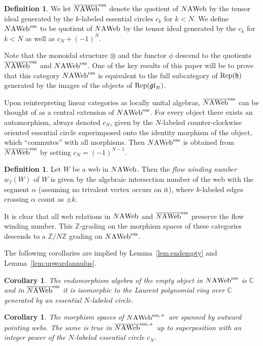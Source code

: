 \documentclass[11pt]{article}
\newtheorem{coro}[theo]{Corollary}
\theoremstyle{definition}
\newtheorem{defi}[theo]{Definition}
\numberwithin{equation}{section}
\newcommand{\glnn}[1]{\mf{gl}_{#1}}
\def\mf{\mathfrak}
\def\C{{\mathbb C}}
\def\Z{{\mathbb Z}}
\newcommand{\reph}{\Rep(\h)}
\def\h{{\mathfrak h}}
\newcommand{\Rep}{\cat{Rep}}
\newcommand{\cat}[1]{\ensuremath{\mbox{\bfseries {\upshape {#1}}}}}
\newcommand{\AWeb}[1][]{#1\cat{A}\cat{Web}}
\newcommand{\essAWeb}[1][]{#1\AWeb^{\mathrm{ess}}}
\newcommand{\essAWebp}[1][]{#1\AWeb^{\mathrm{ess},+}}
\newcommand{\essbAWeb}[1][]{\overline{#1\AWeb}^{\mathrm{ess}}}
\newcommand{\essbAWebp}[1][]{\overline{#1\AWeb}^{\mathrm{ess},+}}
\begin{document}
\begin{defi} We let $\essbAWeb[N]$ denote the quotient of $\AWeb[N]$ by
the tensor ideal generated by the $k$-labeled essential circles $c_k$ for $k<N$. We
define $\essAWeb[N]$ to be quotient of $\AWeb[N]$ by the tensor ideal generated
by the $c_k$ for $k<N$ as well as $c_N+(-1)^N$. 
\end{defi} 

Note that the monoidal structure $\otimes$ and the functor $\phi$ descend to the
quotients $\essbAWeb[N]$ and $\essAWeb[N]$. One of the key results of this paper
will be to prove that this category $\essAWeb[N]$ is equivalent to the full
subcategory of $\reph$ generated by the images of the objects of
$\Rep(\glnn{N})$.

Upon reinterpreting linear categories as locally unital algebras, $\essbAWeb[N]$
can be thought of as a central extension of $\essAWeb[N]$. For every object
there exists an automorphism, always denoted $c_N$, given by the $N$-labeled
counter-clockwise oriented essential circle superimposed onto the identity
morphism of the object, which ``commutes'' with all morphisms. Then
$\essAWeb[N]$ is obtained from $\essbAWeb[N]$ by setting $c_N=(-1)^{N-1}$.

\begin{defi}\label{def:grading} Let $W$ be a web in $\AWeb[N]$. Then the
\emph{flow winding number} $w_f(W)$ of $W$ is given by the algebraic
intersection number of the web with the segment $\alpha$ (assuming no trivalent
vertex occurs on it), where $k$-labeled edges crossing $\alpha$ count as $\pm
k$.
\end{defi}
It is clear that all web relations in $\AWeb[N]$ and $\essbAWeb[N]$ preserve the
flow winding number. This $\Z$-grading on the morphism spaces of these
categories descends to a $\Z/N\Z$ grading on $\essAWeb[N]$.

The following corollaries are implied by Lemma~\ref{lem:endempty} and
Lemma~\ref{lem:upwardannulus}.


\begin{coro}\label{cor:end} The endomorphism algebra of the empty object in
$\essAWeb[N]$ is $\C$ and in $\essbAWeb[N]$ it is isomorphic to the Laurent
polynomial ring over $\C$ generated by an essential $N$-labeled circle. 
\end{coro}

\begin{coro}\label{cor:out} The morphism spaces of $\essAWebp[N]$ are
spanned by outward pointing webs. The same is true in $\essbAWebp[N]$ up to
superposition with an integer power of the $N$-labeled essential circle $c_N$.
\end{coro}
\end{document}
